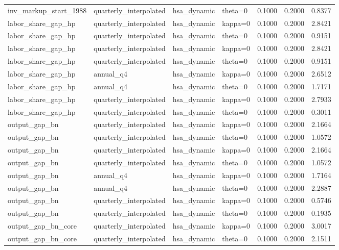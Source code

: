 \begin{tabular}{llllrrr}
inv\_markup\_start\_1988 & quarterly\_interpolated & hsa\_dynamic & theta=0 & 0.1000 & 0.2000 & 0.8377 \\
labor\_share\_gap\_hp & quarterly\_interpolated & hsa\_dynamic & kappa=0 & 0.1000 & 0.2000 & 2.8421 \\
labor\_share\_gap\_hp & quarterly\_interpolated & hsa\_dynamic & theta=0 & 0.1000 & 0.2000 & 0.9151 \\
labor\_share\_gap\_hp & quarterly\_interpolated & hsa\_dynamic & kappa=0 & 0.1000 & 0.2000 & 2.8421 \\
labor\_share\_gap\_hp & quarterly\_interpolated & hsa\_dynamic & theta=0 & 0.1000 & 0.2000 & 0.9151 \\
labor\_share\_gap\_hp & annual\_q4 & hsa\_dynamic & kappa=0 & 0.1000 & 0.2000 & 2.6512 \\
labor\_share\_gap\_hp & annual\_q4 & hsa\_dynamic & theta=0 & 0.1000 & 0.2000 & 1.7171 \\
labor\_share\_gap\_hp & quarterly\_interpolated & hsa\_dynamic & kappa=0 & 0.1000 & 0.2000 & 2.7933 \\
labor\_share\_gap\_hp & quarterly\_interpolated & hsa\_dynamic & theta=0 & 0.1000 & 0.2000 & 0.3011 \\
output\_gap\_bn & quarterly\_interpolated & hsa\_dynamic & kappa=0 & 0.1000 & 0.2000 & 2.1664 \\
output\_gap\_bn & quarterly\_interpolated & hsa\_dynamic & theta=0 & 0.1000 & 0.2000 & 1.0572 \\
output\_gap\_bn & quarterly\_interpolated & hsa\_dynamic & kappa=0 & 0.1000 & 0.2000 & 2.1664 \\
output\_gap\_bn & quarterly\_interpolated & hsa\_dynamic & theta=0 & 0.1000 & 0.2000 & 1.0572 \\
output\_gap\_bn & annual\_q4 & hsa\_dynamic & kappa=0 & 0.1000 & 0.2000 & 1.7164 \\
output\_gap\_bn & annual\_q4 & hsa\_dynamic & theta=0 & 0.1000 & 0.2000 & 2.2887 \\
output\_gap\_bn & quarterly\_interpolated & hsa\_dynamic & kappa=0 & 0.1000 & 0.2000 & 0.5746 \\
output\_gap\_bn & quarterly\_interpolated & hsa\_dynamic & theta=0 & 0.1000 & 0.2000 & 0.1935 \\
output\_gap\_bn\_core & quarterly\_interpolated & hsa\_dynamic & kappa=0 & 0.1000 & 0.2000 & 3.0017 \\
output\_gap\_bn\_core & quarterly\_interpolated & hsa\_dynamic & theta=0 & 0.1000 & 0.2000 & 2.1511 \\

\end{tabular}
